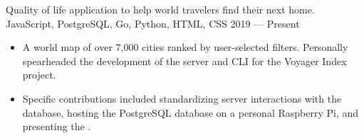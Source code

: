 \showoff
{}
{Quality of life application to help world travelers find their next home.}
{JavaScript, PostgreSQL, Go, Python, HTML, CSS}
{2019 --- Present}

\begin{itemize}
    \item A world map of over 7,000 cities ranked by user-selected filters. Personally spearheaded the development of the server and CLI for the Voyager Index project.
    \item Specific contributions included standardizing server interactions with the database, hosting the PostgreSQL database on a personal Raspberry Pi, and presenting the .
\end{itemize}

